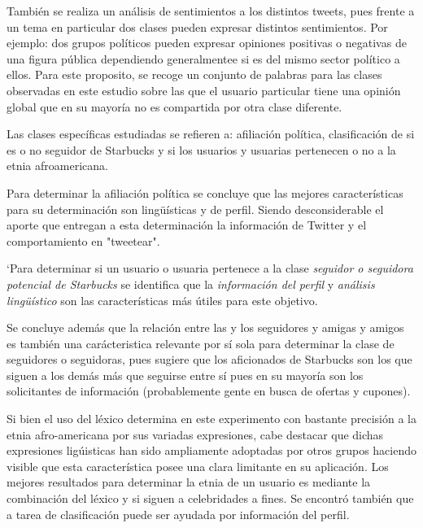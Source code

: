 	         También se realiza un análisis de sentimientos a los distintos tweets, pues frente a un tema en particular dos clases pueden expresar distintos sentimientos. Por ejemplo: dos grupos políticos pueden expresar opiniones positivas o negativas de una figura pública dependiendo generalmentee si es del mismo sector político a ellos.  Para este proposito, se recoge un conjunto de palabras para las clases observadas en este estudio sobre las que el usuario particular tiene una opinión global que en su mayoría no es compartida por otra clase diferente.

    Las clases específicas estudiadas se refieren a: afiliación política, clasificación de si es o no seguidor de Starbucks y si los usuarios  y usuarias pertenecen o no a la etnia afroamericana. 
    

    Para determinar la afiliación política se concluye que las mejores características para su determinación son
    lingüísticas y de perfil. Siendo desconsiderable el aporte que entregan a esta determinación la información de Twitter y el comportamiento en "tweetear".

    `Para determinar si un usuario o usuaria pertenece a la clase \emph{seguidor o seguidora potencial de Starbucks} se identifica que  la \emph{información del perfil} y \emph{análisis lingüístico} son las  características más útiles para este objetivo.

    Se concluye además que la relación entre las y los seguidores y amigas y amigos es también una carácteristica relevante por sí sola para determinar la clase de seguidores o seguidoras, pues sugiere que los aficionados de Starbucks son los que siguen a los demás más que seguirse entre sí pues en su mayoría son los solicitantes de información (probablemente gente en busca de ofertas y cupones).

    Si bien el uso del léxico determina en este experimento con bastante precisión a la etnia afro-americana por sus variadas expresiones, cabe destacar que dichas expresiones ligúisticas han sido ampliamente adoptadas por otros grupos haciendo visible que esta característica posee una clara limitante en su aplicación. Los mejores resultados para determinar la etnia de un usuario es mediante la combinación del léxico y si siguen a celebridades a fines. Se encontró también que a tarea de clasificación puede ser ayudada por información del perfil.
  
